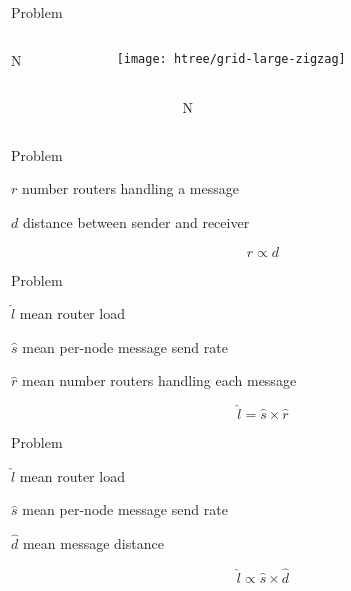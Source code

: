 \begin{frame}{Problem}

\begin{columns}
\begin{column}{0.225\textwidth}
\raggedleft
\Huge
N
\end{column}
\begin{column}{0.65\textwidth}
\centering
\texttt{[image: htree/grid-large-zigzag]}
\end{column}
\begin{column}{0.225\textwidth}
\end{column}
\end{columns}

\begin{columns}
\begin{column}{0.225\textwidth}
\end{column}
\begin{column}{0.65\textwidth}
\centering
\Huge
N
\end{column}
\begin{column}{0.225\textwidth}
\end{column}
\end{columns}

\end{frame}

\begin{frame}{Problem}

$r$ number routers handling a message

$d$ distance between sender and receiver

{\Huge
\[
r \propto d
\]}

\end{frame}

\begin{frame}{Problem}

$\hat{l}$ mean router load

$\hat{s}$ mean per-node message send rate

$\hat{r}$ mean number routers handling each message

{\Huge
\[
\hat{l} = \hat{s} \times \hat{r}
\]}

\end{frame}

\begin{frame}{Problem}

$\hat{l}$ mean router load

$\hat{s}$ mean per-node message send rate

$\hat{d}$ mean message distance

{\Huge
\[
\hat{l} \propto \hat{s} \times \hat{d}
\]}

\end{frame}

